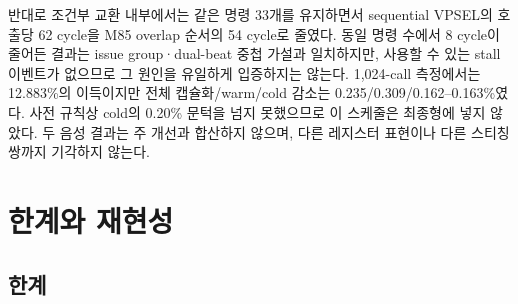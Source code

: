 \documentclass[runningheads,orivec]{llncs}
\begin{document}
반대로 조건부 교환 내부에서는 같은 명령 33개를 유지하면서 sequential VPSEL의 호출당
62 cycle을 M85 overlap 순서의 54 cycle로 줄였다. 동일 명령 수에서 8 cycle이 줄어든
결과는 issue group·dual-beat 중첩 가설과 일치하지만, 사용할 수 있는 stall 이벤트가
없으므로 그 원인을 유일하게 입증하지는 않는다. 1,024-call 측정에서는 12.883\%의
이득이지만 전체 캡슐화/warm/cold 감소는 0.235/0.309/0.162--0.163\%였다. 사전 규칙상
cold의 0.20\% 문턱을 넘지 못했으므로 이 스케줄은 최종형에 넣지 않았다. 두 음성 결과는
주 개선과 합산하지 않으며, 다른 레지스터 표현이나 다른 스티칭 쌍까지 기각하지 않는다.

\FloatBarrier
\section{한계와 재현성}\label{sec:limitations}

\subsection{한계}
\end{document}
